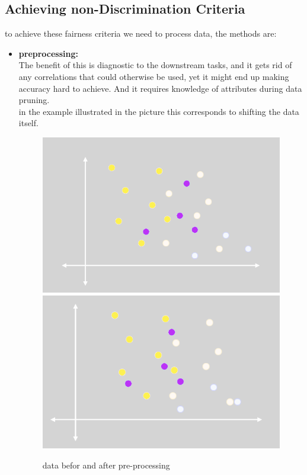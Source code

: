 \subsection{Achieving non-Discrimination Criteria}
to achieve these fairness criteria we need to process data, the methods are:

\begin{itemize}
    \item \textbf{preprocessing:}\\ The benefit of this is diagnostic to the downstream tasks, and it gets rid of any correlations that could otherwise be used, yet it might end up making accuracy hard to achieve. And it requires knowledge of attributes during data pruning.\\
    in the example illustrated in the picture this corresponds to shifting the data itself.
    \begin{figure}
    \centering
    \includegraphics[width=.3\textwidth]{graphics/p1.png}
    \includegraphics[width=.3\textwidth]{graphics/p2.png}
    \caption{data befor and after pre-processing}
    \end{figure}
    

\end{itemize}
